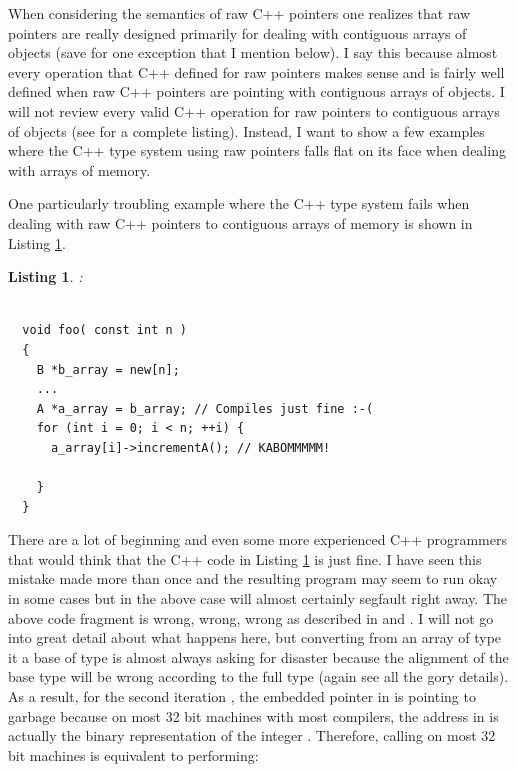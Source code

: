 \documentclass[pdf,ps2pdf,11pt]{SANDreport}
\newtheorem{listing}{Listing}
\begin{document}
When considering the semantics of raw C++ pointers one realizes that
raw pointers are really designed primarily for dealing with contiguous
arrays of objects (save for one exception that I mention below).  I
say this because almost every operation that C++ defined for raw
pointers makes sense and is fairly well defined when raw C++ pointers
are pointing with contiguous arrays of objects.  I will not review
every valid C++ operation for raw pointers to contiguous arrays of
objects (see {}\cite{stroustrup97} for a complete listing).  Instead,
I want to show a few examples where the C++ type system using raw
pointers falls flat on its face when dealing with arrays of memory.

One particularly troubling example where the C++ type system fails
when dealing with raw C++ pointers to contiguous arrays of memory is
shown in Listing {}\ref{listing:BadArrayPointerConversion}.

\begin{listing}:\\
\label{listing:BadArrayPointerConversion}
{\small\begin{verbatim}

  void foo( const int n )
  {
    B *b_array = new[n];
    ...
    A *a_array = b_array; // Compiles just fine :-(
    for (int i = 0; i < n; ++i) {
      a_array[i]->incrementA(); // KABOMMMMM!

    }
  }

\end{verbatim}}
\end{listing}

There are a lot of beginning and even some more experienced C++
programmers that would think that the C++ code in Listing
{}\ref{listing:BadArrayPointerConversion} is just fine.  I have seen
this mistake made more than once and the resulting program may seem to
run okay in some cases but in the above case will almost certainly
segfault right away.  The above code fragment is wrong, wrong, wrong
as described in {}\cite[Gotcha \#33]{C++Gotchas03} and {}\cite[Item
\#100]{C++CodingStandards05}.  I will not go into great detail about
what happens here, but converting from an array of type {}
it a base of type {} is almost always asking for disaster
because the alignment of the base type {} will be wrong
according to the full type {} (again see {}\cite[Gotcha
\#33]{C++Gotchas03} all the gory details).  As a result, for the
second iteration {}, the embedded pointer in
{} is pointing to garbage because on
most 32 bit machines with most compilers, the address in
{} is actually the binary
representation of the integer {}.
Therefore, calling {} on most 32 bit
machines is equivalent to performing:
\end{document}
